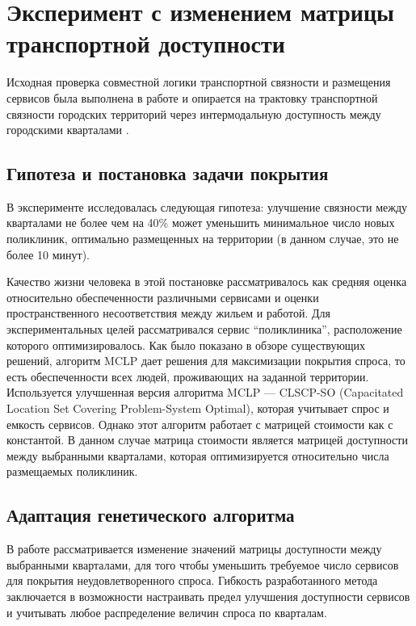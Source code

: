 \section{Эксперимент с изменением матрицы транспортной доступности}
\label{sec:icccsa-connectivity-placement-experiment}

Исходная проверка совместной логики транспортной связности и размещения сервисов была выполнена в работе \cite{kontsevik2024connectivityPlacement} и опирается на трактовку транспортной связности городских территорий через интермодальную доступность между городскими кварталами \cite{morozov2023transportConnectivity}.
\subsection{Гипотеза и постановка задачи покрытия}
\label{subsec:icccsa-hypothesis-location-coverage}

В эксперименте исследовалась следующая гипотеза: улучшение связности между кварталами не более чем на 40\% может уменьшить минимальное число новых поликлиник, оптимально размещенных на территории (в данном случае, это не более 10 минут).

Качество жизни человека в этой постановке рассматривалось как средняя оценка относительно обеспеченности различными сервисами и оценки пространственного несоответствия между жильем и работой. Для экспериментальных целей рассматривался сервис ``поликлиника'', расположение которого оптимизировалось. Как было показано в обзоре существующих решений, алгоритм MCLP дает решения для максимизации покрытия спроса, то есть обеспеченности всех людей, проживающих на заданной территории. Используется улучшенная версия алгоритма MCLP --- CLSCP-SO (Capacitated Location Set Covering Problem-System Optimal), которая учитывает спрос и емкость сервисов. Однако этот алгоритм работает с матрицей стоимости как с константой. В данном случае матрица стоимости является матрицей доступности между выбранными кварталами, которая оптимизируется относительно числа размещаемых поликлиник.

\subsection{Адаптация генетического алгоритма}
\label{subsec:icccsa-genetic-adaptation}

В работе рассматривается изменение значений матрицы доступности между выбранными кварталами, для того чтобы уменьшить требуемое число сервисов для покрытия неудовлетворенного спроса. Гибкость разработанного метода заключается в возможности настраивать предел улучшения доступности сервисов и учитывать любое распределение величин спроса по кварталам.

